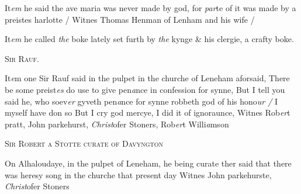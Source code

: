 \documentclass[12pt, a4paper]{book}
\begin{document}
		\ifthenelse{\isodd{\thepage}}
		{\reversemarginpar}
		{\normalmarginpar}
		 It\textit{em} he said the ave maria was never made by god, for \textit{par}te of it was
 made by a preistes harlotte / Witnes Thomas Henman of Lenham
 and his wife /

		\ifthenelse{\isodd{\thepage}}
		{\reversemarginpar}
		{\normalmarginpar}
		 It\textit{em} he called \textit{the} boke lately set furth by \textit{the} kynge \& his clergie,
 a crafty boke.

            
               
				\begin{center} \begin{large} {\scshape Sir Rauf.} \end{large} \end{center}
			

 	
 		
			
            	
			
 		
		\ifthenelse{\isodd{\thepage}}
		{\reversemarginpar}
		{\normalmarginpar}
		It\textit{e}m one Sir Rauf said in the pulpet in the churche of
 Leneham aforsaid, There be some preist\textit{es} do use to give pen\textit{a}nce in
  confession for synne, But I tell you said he, who soev\textit{er} gyveth
 pen\textit{a}nce for synne robbeth god of his hono\textit{ur /} I myself have don so
 			But I cry god mercye, I did it of ignoraunce, Witnes Rob\textit{er}t
 				pratt, John parkehurst, \textit{Christ}ofer Stoners, Rob\textit{er}t Willi\textit{a}mson
 

            
            	
				\begin{center} \begin{large} {\scshape Sir Robert a Stotte curate
 of Davyngton} \end{large} \end{center}
			

	
		
				\marginpar[\vspace{0.5cm}{\textcolor{Gray}{1541}}]{}
			
            		
				\marginpar[\vspace{0.5cm}{\textcolor{Gray}{offensive n}}]{}
			
            		
		\ifthenelse{\isodd{\thepage}}
		{\reversemarginpar}
		{\normalmarginpar}
		On Alhaloudaye, in the pulpet of Leneham, he being curate ther
  said that there was heresy song in the churche that present day
  Witnes John parkehurste, \textit{Christ}ofer Stoners
	
\end{document}
